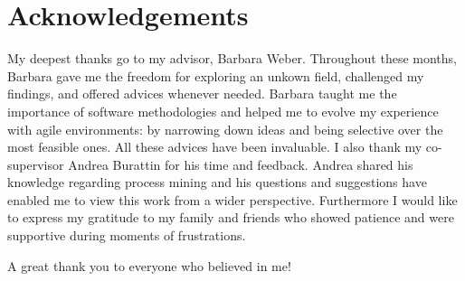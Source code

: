 \chapter{Acknowledgements}

My deepest thanks go to my advisor, Barbara Weber. Throughout these months, Barbara gave me the freedom for exploring an unkown field, challenged my findings, and offered advices whenever needed. Barbara taught me the importance of software methodologies and helped me to evolve my experience with agile environments: by narrowing down ideas and being selective over the most feasible ones. All these advices have been invaluable. 
I also thank my co-supervisor Andrea Burattin for his time and feedback. Andrea shared his knowledge regarding process mining and his questions and suggestions have enabled me to view this work from a wider perspective.
Furthermore I would like to express my gratitude to my family and friends who showed patience and were supportive during moments of frustrations.

A great thank you to everyone who believed in me! 

